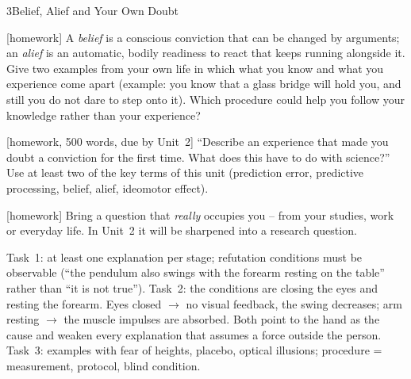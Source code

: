 \begin{uebungsblattb}{3}{Belief, Alief and Your Own Doubt}

[homework]
A \emph{belief} is a conscious conviction that can be changed by
arguments; an \emph{alief} is an automatic, bodily readiness to react that
keeps running alongside it. Give two examples from your own life in which
what you know and what you experience come apart (example: you know that a
glass bridge will hold you, and still you do not dare to step onto it).
Which procedure could help you follow your knowledge rather than your
experience?

[homework, 500 words, due by Unit~2]
\enquote{Describe an experience that made you doubt a conviction for the
first time. What does this have to do with science?} Use at least two of
the key terms of this unit (prediction error, predictive processing,
belief, alief, ideomotor effect).

[homework]
Bring a question that \emph{really} occupies you -- from your studies,
work or everyday life. In Unit~2 it will be sharpened into a research
question.

\begin{lehrhinweis}
Task~1: at least one explanation per stage; refutation conditions must be
observable (\enquote{the pendulum also swings with the forearm resting on
the table} rather than \enquote{it is not true}). Task~2: the conditions
are closing the eyes and resting the forearm. Eyes closed $\to$ no visual
feedback, the swing decreases; arm resting $\to$ the muscle impulses are
absorbed. Both point to the hand as the cause and weaken every explanation
that assumes a force outside the person. Task~3: examples with fear of
heights, placebo, optical illusions; procedure = measurement, protocol,
blind condition.
\end{lehrhinweis}
\end{uebungsblattb}
